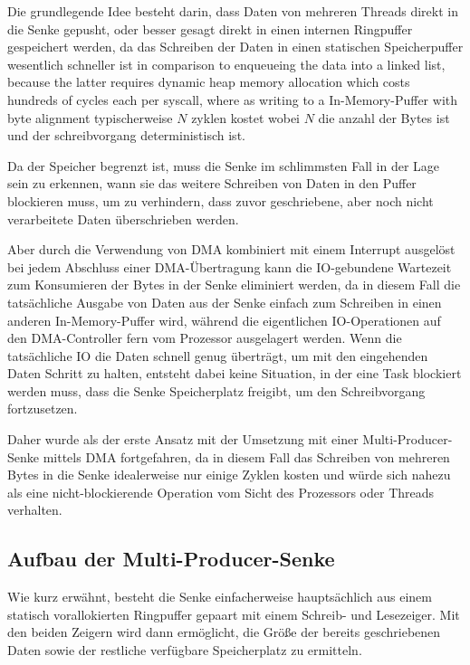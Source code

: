 Die grundlegende Idee besteht darin, dass Daten von mehreren Threads direkt in
die Senke gepusht, oder besser gesagt direkt in einen internen Ringpuffer
gespeichert werden, da das Schreiben der Daten in einen statischen
Speicherpuffer wesentlich schneller ist in comparison to enqueueing the data
into a linked list, because the latter requires dynamic heap memory allocation
which costs hundreds of cycles each per syscall, where as writing to a
In-Memory-Puffer with byte alignment typischerweise $N$ zyklen kostet wobei $N$
die anzahl der Bytes ist und der schreibvorgang deterministisch ist.

Da der Speicher begrenzt ist, muss die Senke im schlimmsten Fall in der Lage
sein zu erkennen, wann sie das weitere Schreiben von Daten in den Puffer
blockieren muss, um zu verhindern, dass zuvor geschriebene, aber noch nicht
verarbeitete Daten überschrieben werden.

Aber durch die Verwendung von DMA kombiniert mit einem Interrupt ausgelöst bei
jedem Abschluss einer DMA-Übertragung kann die IO-gebundene Wartezeit zum
Konsumieren der Bytes in der Senke eliminiert werden, da in diesem Fall die
tatsächliche Ausgabe von Daten aus der Senke einfach zum Schreiben in einen
anderen In-Memory-Puffer wird, während die eigentlichen IO-Operationen auf den
DMA-Controller fern vom Prozessor ausgelagert werden. Wenn die tatsächliche IO
die Daten schnell genug überträgt, um mit den eingehenden Daten Schritt zu
halten, entsteht dabei keine Situation, in der eine Task blockiert werden muss,
dass die Senke Speicherplatz freigibt, um den Schreibvorgang fortzusetzen.

Daher wurde als der erste Ansatz mit der Umsetzung mit einer
Multi-Producer-Senke mittels DMA fortgefahren, da in diesem Fall das Schreiben
von mehreren Bytes in die Senke idealerweise nur einige Zyklen kosten und würde
sich nahezu als eine nicht-blockierende Operation vom Sicht des Prozessors oder
Threads verhalten.

\subsection{Aufbau der Multi-Producer-Senke}

Wie kurz erwähnt, besteht die Senke einfacherweise hauptsächlich aus einem
statisch vorallokierten Ringpuffer gepaart mit einem Schreib- und Lesezeiger.
Mit den beiden Zeigern wird dann ermöglicht, die Größe der bereits geschriebenen
Daten sowie der restliche verfügbare Speicherplatz zu ermitteln.

